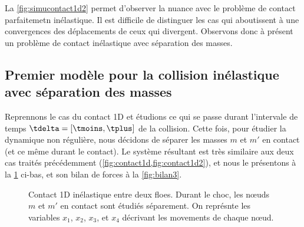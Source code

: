 \noindent La \cref{fig:simucontact1d2} permet d'observer la nuance avec le problème de contact parfaitemetn inélastique. Il est difficile de distinguer les cas qui aboutissent à une convergences des déplacements de ceux qui divergent. Observons donc à présent un problème de contact inélastique avec séparation des masses.






\subsection{Premier modèle pour la collision inélastique avec séparation des masses}
\label{subsubsec:colinesepma}

Reprennons le cas du contact 1D et étudions ce qui se passe durant l'intervale de temps $\tdelta = [\tmoins, \tplus]$ de la collision. Cette fois, pour étudier la dynamique non régulière, nous décidons de séparer les masses $m$ et $m'$ en contact (et ce même durant le contact). Le système résultant est très similaire aux deux cas traités précédemment (\cref{fig:contact1d,fig:contact1d2}), et nous le présentons à la \cref{fig:contact1d3} ci-bas, et son bilan de forces à la \cref{fig:bilan3}.

\begin{figure}[!h]
    \centering
    \caption{Contact 1D inélastique entre deux floes. Durant le choc, les nœuds $m$ et $m'$ en contact sont étudiés séparement. On représnte les variables $x_1$, $x_2$, $x_3$, et $x_4$ décrivant les movements de chaque n\oe{}ud.}
    \label{fig:contact1d3}
\end{figure}


